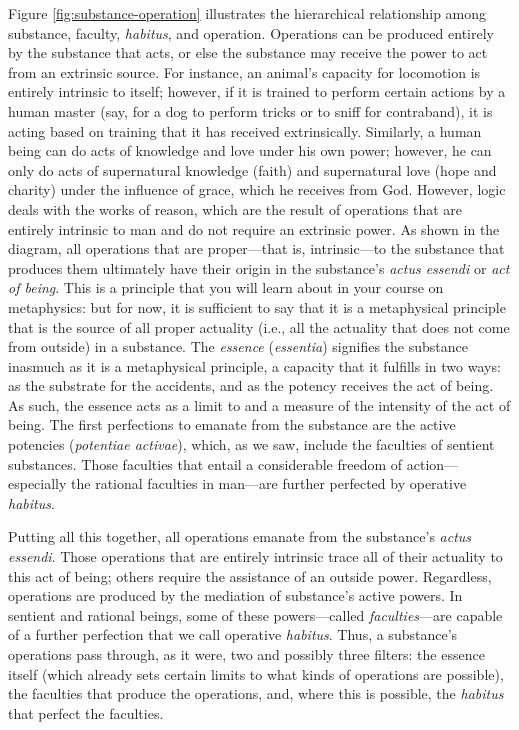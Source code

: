 \documentclass[
  12pt,
]{memoir}
\begin{document}
Figure \ref{fig:substance-operation} illustrates the hierarchical
relationship among substance, faculty, \emph{habitus}, and operation.
Operations can be produced entirely by the substance that acts, or else
the substance may receive the power to act from an extrinsic source. For
instance, an animal's capacity for locomotion is entirely intrinsic to
itself; however, if it is trained to perform certain actions by a human
master (say, for a dog to perform tricks or to sniff for contraband), it
is acting based on training that it has received extrinsically.
Similarly, a human being can do acts of knowledge and love under his own
power; however, he can only do acts of supernatural knowledge (faith)
and supernatural love (hope and charity) under the influence of grace,
which he receives from God. However, logic deals with the works of
reason, which are the result of operations that are entirely intrinsic
to man and do not require an extrinsic power. As shown in the diagram,
all operations that are proper---that is, intrinsic---to the substance
that produces them ultimately have their origin in the substance's
\emph{actus essendi} or \emph{act of being}. This is a principle that
you will learn about in your course on metaphysics: but for now, it is
sufficient to say that it is a metaphysical principle that is the source
of all proper actuality (i.e., all the actuality that does not come from
outside) in a substance. The \emph{essence} (\emph{essentia}) signifies
the substance inasmuch as it is a metaphysical principle, a capacity
that it fulfills in two ways: as the substrate for the accidents, and as
the potency receives the act of being. As such, the essence acts as a
limit to and a measure of the intensity of the act of being. The first
perfections to emanate from the substance are the active potencies
(\emph{potentiae activae}), which, as we saw, include the faculties of
sentient substances. Those faculties that entail a considerable freedom
of action---especially the rational faculties in man---are further
perfected by operative \emph{habitus}.

Putting all this together, all operations emanate from the substance's
\emph{actus essendi}. Those operations that are entirely intrinsic trace
all of their actuality to this act of being; others require the
assistance of an outside power. Regardless, operations are produced by
the mediation of substance's active powers. In sentient and rational
beings, some of these powers---called \emph{faculties}---are capable of
a further perfection that we call operative \emph{habitus}. Thus, a
substance's operations pass through, as it were, two and possibly three
filters: the essence itself (which already sets certain limits to what
kinds of operations are possible), the faculties that produce the
operations, and, where this is possible, the \emph{habitus} that perfect
the faculties.
\end{document}
